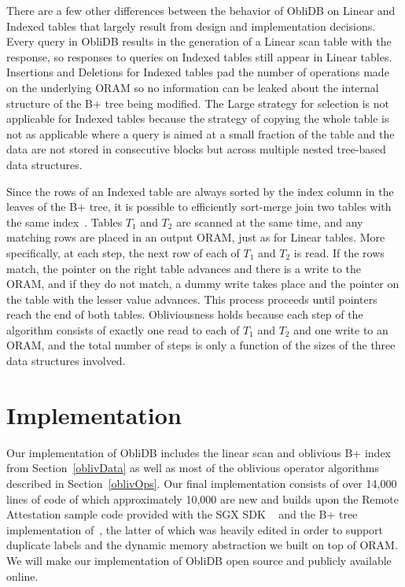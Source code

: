 \documentclass[letterpaper,twocolumn,10pt]{article}
\def\name/{ObliDB}
\begin{document}
There are a few other differences between the behavior of \name/ on Linear and Indexed tables that largely result from design and implementation decisions. Every query in \name/ results in the generation of a Linear scan table with the response, so responses to queries on Indexed tables still appear in Linear tables. Insertions and Deletions for Indexed tables pad the number of operations made on the underlying ORAM so no information can be leaked about the internal structure of the B+ tree being modified. The Large strategy for selection is not applicable for Indexed tables because the strategy of copying the whole table is not as applicable where a query is aimed at a small fraction of the table and the data are not stored in consecutive blocks but across multiple nested tree-based data structures. 

Since the rows of an Indexed table are always sorted by the index column in the leaves of the B+ tree, it is possible to efficiently sort-merge join two tables with the same index~\cite{EN10}. Tables $T_1$ and $T_2$ are scanned at the same time, and any matching rows are placed in an output ORAM, just as for Linear tables. More specifically, at each step, the next row of each of $T_1$ and $T_2$ is read. If the rows match, the pointer on the right table advances and there is a write to the ORAM, and if they do not match, a dummy write takes place and the pointer on the table with the lesser value advances. This process proceeds until pointers reach the end of both tables. Obliviousness holds because each step of the algorithm consists of exactly one read to each of $T_1$ and $T_2$ and one write to an ORAM, and the total number of steps is only a function of the sizes of the three data structures involved.  

\section{Implementation}\label{imp}
Our implementation of \name/ includes the linear scan and oblivious B+ index from Section~\ref{oblivData} as well as most of the oblivious operator algorithms described in Section~\ref{oblivOps}. Our final implementation consists of over 14,000 lines of code of which approximately 10,000 are new and builds upon the Remote Attestation sample code provided with the SGX SDK ~\cite{SGXRef} and the B+ tree implementation of~\cite{BPlus}, the latter of which was heavily edited in order to support duplicate labels and the dynamic memory abstraction we built on top of ORAM. We will make our implementation of \name/ open source and publicly available online.
\end{document}
